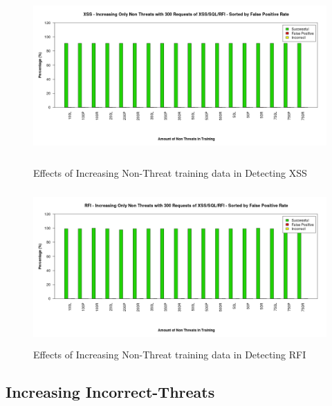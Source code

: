 \begin{appendices}
\begin{figure}[hp]
	\centering
	\includegraphics[height=225px]{./assets/appendix/fullresults/svm/nonthreat/Results_XSS.png}
	\caption{Effects of Increasing Non-Threat training data in Detecting XSS}
	\includegraphics[height=225px]{./assets/appendix/fullresults/svm/nonthreat/Results_RFI.png}
	\caption{Effects of Increasing Non-Threat training data in Detecting RFI}
\end{figure}

\newpage
\subsection{Increasing Incorrect-Threats} \label{app:resIncorrect}


\end{appendices}

